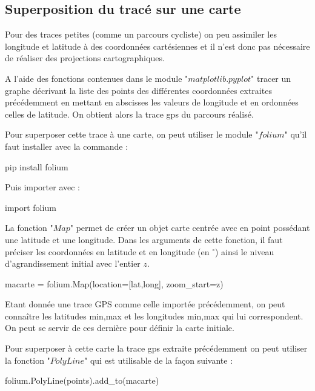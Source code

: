 \subsection{Superposition du tracé sur une carte}

Pour des traces petites (comme un parcours cycliste) on peu assimiler les longitude et latitude à des coordonnées cartésiennes et il n'est donc pas nécessaire de réaliser des projections cartographiques.

\question{} A l'aide des fonctions contenues dans le module "$matplotlib.pyplot$" tracer un graphe décrivant la liste des points des différentes coordonnées extraites précédemment en mettant en abscisses les valeurs de longitude et en ordonnées celles de latitude. On obtient alors la trace gps du parcours réalisé.



Pour superposer cette trace à une carte, on peut utiliser le module "$folium$" qu'il faut installer avec la commande : 

\begin{pyverbatim}
pip install folium
\end{pyverbatim}

Puis importer avec :

\begin{pyverbatim}
import folium
\end{pyverbatim}

La fonction "$Map$" permet de créer un objet carte centrée avec en point possédant une latitude et une longitude. Dans les arguments de cette fonction, il faut préciser les coordonnées en latitude et en longitude (en $^{\circ}$) ainsi le niveau d'agrandissement initial avec l'entier $z$.

\begin{pyverbatim}
macarte = folium.Map(location=[lat,long], zoom_start=z)
\end{pyverbatim}

Etant donnée une trace GPS comme celle importée précédemment, on peut connaître les latitudes min,max et les longitudes min,max qui lui correspondent. On peut se servir de ces dernière pour définir la carte initiale.

Pour superposer à cette carte la trace gps extraite précédemment on peut utiliser la fonction "$PolyLine$" qui est utilisable de la façon suivante : 

\begin{pyverbatim}
folium.PolyLine(points).add_to(macarte)
\end{pyverbatim}

